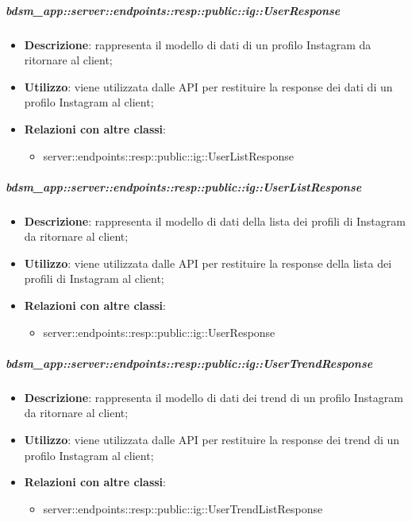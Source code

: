     \subparagraph{bdsm\_app::server::endpoints::resp::public::ig::UserResponse} %
    \label{subp:bdsm_app_server_endpoints_resp_public_ig_userresponse}
    \begin{itemize}
      \item \textbf{Descrizione}: rappresenta il modello di dati di un profilo Instagram da ritornare al client;
      \item \textbf{Utilizzo}: viene utilizzata dalle API per restituire la response dei dati di un profilo Instagram al client;
      \item \textbf{Relazioni con altre classi}:
        \begin{itemize}
          \item server::endpoints::resp::public::ig::UserListResponse
        \end{itemize}
      \end{itemize}
    
    \subparagraph{bdsm\_app::server::endpoints::resp::public::ig::UserListResponse} %
    \label{subp:bdsm_app_server_endpoints_resp_public_ig_userlistresponse}
    \begin{itemize}
      \item \textbf{Descrizione}: rappresenta il modello di dati della lista dei profili di Instagram da ritornare al client;
      \item \textbf{Utilizzo}: viene utilizzata dalle API per restituire la response della lista dei profili di Instagram al client;
      \item \textbf{Relazioni con altre classi}:
        \begin{itemize}
          \item server::endpoints::resp::public::ig::UserResponse
        \end{itemize}
      \end{itemize}
    
    \subparagraph{bdsm\_app::server::endpoints::resp::public::ig::UserTrendResponse} %
    \label{subp:bdsm_app_server_endpoints_resp_public_ig_usertrendresponse}
    \begin{itemize}
      \item \textbf{Descrizione}: rappresenta il modello di dati dei trend di un profilo Instagram da ritornare al client;
      \item \textbf{Utilizzo}: viene utilizzata dalle API per restituire la response dei trend di un profilo Instagram al client;
      \item \textbf{Relazioni con altre classi}:
        \begin{itemize}
          \item server::endpoints::resp::public::ig::UserTrendListResponse
        \end{itemize}
      \end{itemize}
    
